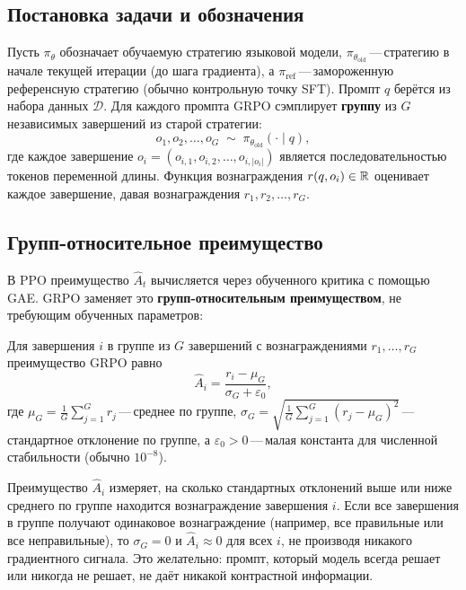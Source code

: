 \subsection{Постановка задачи и обозначения}

Пусть $\pi_\theta$ обозначает обучаемую стратегию языковой модели, $\pi_{\theta_\mathrm{old}}$\,---\,стратегию в начале текущей итерации (до шага градиента), а $\pi_\mathrm{ref}$\,---\,замороженную референсную стратегию (обычно контрольную точку SFT). Промпт $q$ берётся из набора данных $\mathcal{D}$. Для каждого промпта GRPO сэмплирует \textbf{группу} из $G$ независимых завершений из старой стратегии:
\begin{equation}
\label{eq:grpo-sampling}
o_1, o_2, \ldots, o_G \;\sim\; \pi_{\theta_\mathrm{old}}(\cdot \mid q),
\end{equation}
где каждое завершение $o_i = (o_{i,1}, o_{i,2}, \ldots, o_{i,|o_i|})$ является последовательностью токенов переменной длины. Функция вознаграждения $r(q, o_i) \in \mathbb{R}$ оценивает каждое завершение, давая вознаграждения $r_1, r_2, \ldots, r_G$.

\subsection{Групп-относительное преимущество}

В PPO преимущество $\hat{A}_t$ вычисляется через обученного критика с помощью GAE. GRPO заменяет это \textbf{групп-относительным преимуществом}, не требующим обученных параметров:

\begin{definition}
\label{def:grpo-advantage}
Для завершения $i$ в группе из $G$ завершений с вознаграждениями $r_1, \ldots, r_G$ преимущество GRPO равно
\begin{equation}
\label{eq:grpo-advantage}
\hat{A}_i = \frac{r_i - \mu_G}{\sigma_G + \varepsilon_0},
\end{equation}
где $\mu_G = \frac{1}{G}\sum_{j=1}^G r_j$\,---\,среднее по группе, $\sigma_G = \sqrt{\frac{1}{G}\sum_{j=1}^G (r_j - \mu_G)^2}$\,---\,стандартное отклонение по группе, а $\varepsilon_0 > 0$\,---\,малая константа для численной стабильности (обычно $10^{-8}$).
\end{definition}

Преимущество $\hat{A}_i$ измеряет, на сколько стандартных отклонений выше или ниже среднего по группе находится вознаграждение завершения $i$. Если все завершения в группе получают одинаковое вознаграждение (например, все правильные или все неправильные), то $\sigma_G = 0$ и $\hat{A}_i \approx 0$ для всех $i$, не производя никакого градиентного сигнала. Это желательно: промпт, который модель всегда решает или никогда не решает, не даёт никакой контрастной информации.

